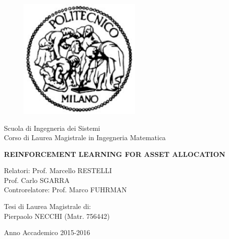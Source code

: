 \begin{titlepage}

	\begin{figure}[htpb]
		\centering
		\includegraphics[width=6cm]{Cover/PolimiLogo}
	\end{figure}

	\begin{center}
		\normalsize 
			Scuola di Ingegneria dei Sistemi\\
      Corso di Laurea Magistrale in Ingegneria Matematica\\
      \vspace{0.5cm}
  	\vspace{1cm}
	\end{center}
	
	\begin{center}
		\LARGE
			\textbf{REINFORCEMENT LEARNING FOR ASSET ALLOCATION}
		\vspace{1.5cm}
	\end{center}

	\begin{flushleft}
		\Large
			Relatori: Prof. Marcello RESTELLI\\
					  Prof. Carlo SGARRA\\
			Controrelatore: Prof. Marco FUHRMAN\\
			\vspace{1.5cm}
	\end{flushleft}
	
	\begin{flushright}
		\Large
		Tesi di Laurea Magistrale di:\\
		Pierpaolo NECCHI  (Matr. 756442)\\		
		\vspace{1.5cm}
	\end{flushright}
	
	\vspace*{\fill}
	\begin{center}
		Anno Accademico 2015-2016
	\end{center}
	
\end{titlepage}
